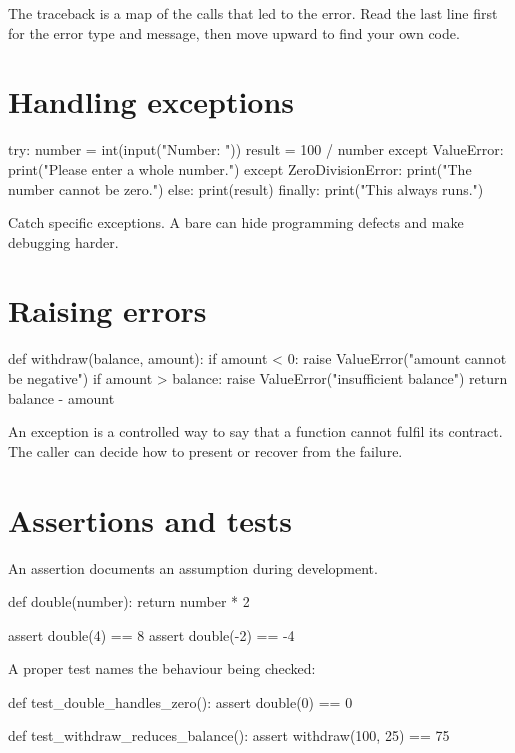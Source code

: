 \documentclass[11pt,openany,oneside]{book}
\newcommand{\inlinecode}[1]{\texttt{\small\detokenize{#1}}}
\begin{document}
The traceback is a map of the calls that led to the error. Read the last line first for the error type and message, then move upward to find your own code.

\section{Handling exceptions}

\begin{code}[language=Python]
try:
    number = int(input("Number: "))
    result = 100 / number
except ValueError:
    print("Please enter a whole number.")
except ZeroDivisionError:
    print("The number cannot be zero.")
else:
    print(result)
finally:
    print("This always runs.")
\end{code}

Catch specific exceptions. A bare \inlinecode{except:} can hide programming defects and make debugging harder.

\section{Raising errors}

\begin{code}[language=Python]
def withdraw(balance, amount):
    if amount < 0:
        raise ValueError("amount cannot be negative")
    if amount > balance:
        raise ValueError("insufficient balance")
    return balance - amount
\end{code}

An exception is a controlled way to say that a function cannot fulfil its contract. The caller can decide how to present or recover from the failure.

\section{Assertions and tests}

An assertion documents an assumption during development.

\begin{code}[language=Python]
def double(number):
    return number * 2

assert double(4) == 8
assert double(-2) == -4
\end{code}

A proper test names the behaviour being checked:

\begin{code}[language=Python]
def test_double_handles_zero():
    assert double(0) == 0

def test_withdraw_reduces_balance():
    assert withdraw(100, 25) == 75
\end{code}
\end{document}
